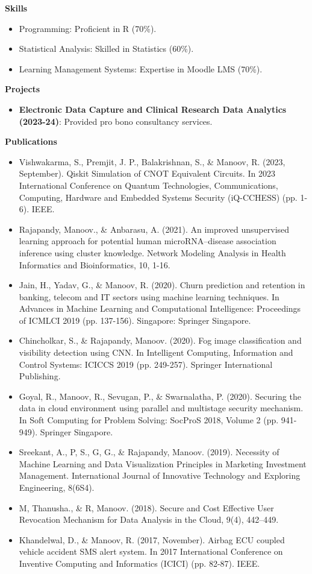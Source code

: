 \documentclass[a4paper,10pt]{article}
\newcommand{\cvsection}[1]{%
    \vspace{2mm}
    \begin{tcolorbox}
        \textbf{\large #1}
    \end{tcolorbox}
    \vspace{-4mm}
}
\begin{document}
\cvsection{Skills}
\begin{itemize}[leftmargin=*]
    \item Programming: Proficient in R (70\%).
    \item Statistical Analysis: Skilled in Statistics (60\%).
    \item Learning Management Systems: Expertise in Moodle LMS (70\%).
\end{itemize}

\cvsection{Projects}
\begin{itemize}[leftmargin=*]
    \item \textbf{Electronic Data Capture and Clinical Research Data Analytics (2023-24)}: Provided pro bono consultancy services.
\end{itemize}
\cvsection{Publications}
\begin{itemize}[leftmargin=*]
    \item Vishwakarma, S., Premjit, J. P., Balakrishnan, S., \& Manoov, R. (2023, September). Qiskit Simulation of CNOT Equivalent Circuits. In 2023 International Conference on Quantum Technologies, Communications, Computing, Hardware and Embedded Systems Security (iQ-CCHESS) (pp. 1-6). IEEE.
    \item Rajapandy, Manoov., \& Anbarasu, A. (2021). An improved unsupervised learning approach for potential human microRNA–disease association inference using cluster knowledge. Network Modeling Analysis in Health Informatics and Bioinformatics, 10, 1-16.
    \item Jain, H., Yadav, G., \& Manoov, R. (2020). Churn prediction and retention in banking, telecom and IT sectors using machine learning techniques. In Advances in Machine Learning and Computational Intelligence: Proceedings of ICMLCI 2019 (pp. 137-156). Singapore: Springer Singapore.
    \item Chincholkar, S., \& Rajapandy, Manoov. (2020). Fog image classification and visibility detection using CNN. In Intelligent Computing, Information and Control Systems: ICICCS 2019 (pp. 249-257). Springer International Publishing.
    \item Goyal, R., Manoov, R., Sevugan, P., \& Swarnalatha, P. (2020). Securing the data in cloud environment using parallel and multistage security mechanism. In Soft Computing for Problem Solving: SocProS 2018, Volume 2 (pp. 941-949). Springer Singapore.
    \item Sreekant, A., P, S., G, G., \& Rajapandy, Manoov. (2019). Necessity of Machine Learning and Data Visualization Principles in Marketing Investment Management. International Journal of Innovative Technology and Exploring Engineering, 8(6S4).
    \item M, Thanusha., \& R, Manoov. (2018). Secure and Cost Effective User Revocation Mechanism for Data Analysis in the Cloud, 9(4), 442–449. 
    \item Khandelwal, D., \& Manoov, R. (2017, November). Airbag ECU coupled vehicle accident SMS alert system. In 2017 International Conference on Inventive Computing and Informatics (ICICI) (pp. 82-87). IEEE.
\end{itemize}
\end{document}
